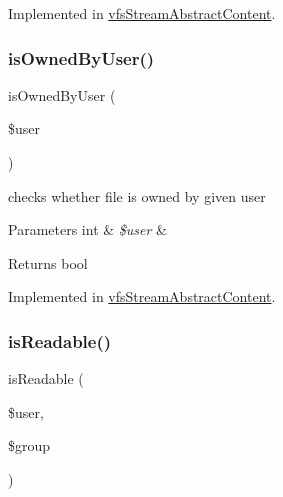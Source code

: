 Implemented in \mbox{\hyperlink{classorg_1_1bovigo_1_1vfs_1_1vfs_stream_abstract_content_a9fd5109b1a5bdb7e28dd6021e914e907}{vfs\+Stream\+Abstract\+Content}}.

\mbox{\label{interfaceorg_1_1bovigo_1_1vfs_1_1vfs_stream_content_ad94371c199637d2e0b56ed9771d3fbf6}} 
\subsubsection{\texorpdfstring{is\+Owned\+By\+User()}{isOwnedByUser()}}
{\footnotesize\ttfamily is\+Owned\+By\+User (\begin{DoxyParamCaption}\item[{}]{\$user }\end{DoxyParamCaption})}

checks whether file is owned by given user


\begin{DoxyParams}[1]{Parameters}
int & {\em \$user} & \\
\hline
\end{DoxyParams}
\begin{DoxyReturn}{Returns}
bool 
\end{DoxyReturn}


Implemented in \mbox{\hyperlink{classorg_1_1bovigo_1_1vfs_1_1vfs_stream_abstract_content_ad94371c199637d2e0b56ed9771d3fbf6}{vfs\+Stream\+Abstract\+Content}}.

\mbox{\label{interfaceorg_1_1bovigo_1_1vfs_1_1vfs_stream_content_a6e17ffc20ba30d5013b65b8f8c878363}} 
\subsubsection{\texorpdfstring{is\+Readable()}{isReadable()}}
{\footnotesize\ttfamily is\+Readable (\begin{DoxyParamCaption}\item[{}]{\$user,  }\item[{}]{\$group }\end{DoxyParamCaption})}

